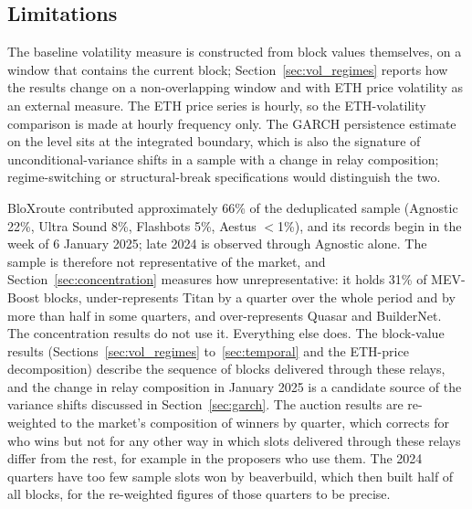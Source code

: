 \documentclass[11pt]{article}
\begin{document}
\subsection{Limitations}
\label{sec:limitations}

The baseline volatility measure is constructed from block values themselves,
on a window that contains the current block; Section~\ref{sec:vol_regimes}
reports how the results change on a non-overlapping window and with ETH
price volatility as an external measure. The ETH price series is hourly, so
the ETH-volatility comparison is made at hourly frequency only. The GARCH persistence estimate on the
level sits at the integrated boundary, which is also the signature of
unconditional-variance shifts in a sample with a change in relay composition;
regime-switching or structural-break specifications would distinguish the two.

BloXroute contributed approximately 66\% of the deduplicated sample
(Agnostic 22\%, Ultra Sound 8\%, Flashbots 5\%, Aestus $<$1\%), and its
records begin in the week of 6 January 2025; late 2024 is observed through
Agnostic alone. The sample is therefore not representative of the market,
and Section~\ref{sec:concentration} measures how unrepresentative: it holds
31\% of MEV-Boost blocks, under-represents Titan by a quarter over the whole
period and by more than half in some quarters, and over-represents Quasar
and BuilderNet. The concentration results do not use it. Everything else
does. The block-value results (Sections~\ref{sec:vol_regimes}
to~\ref{sec:temporal} and the ETH-price decomposition) describe the sequence
of blocks delivered through these relays, and the change in relay
composition in January 2025 is a candidate source of the variance shifts
discussed in Section~\ref{sec:garch}. The auction results are re-weighted to
the market's composition of winners by quarter, which corrects for who wins
but not for any other way in which slots delivered through these relays
differ from the rest, for example in the proposers who use them. The 2024
quarters have too few sample slots won by beaverbuild, which then built
half of all blocks, for the re-weighted figures of those quarters to be
precise.
\end{document}
